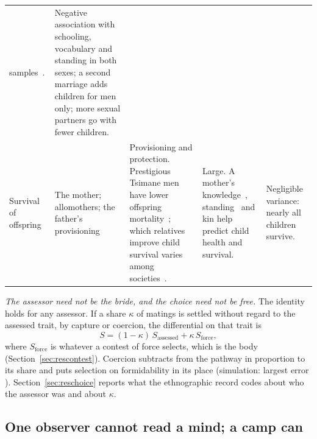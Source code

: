 \begin{table}[t]
\begin{tabularx}{\textwidth}{@{}P{0.115\textwidth}P{0.125\textwidth}LLP{0.205\textwidth}@{}}
samples~\cite{jokela2010,moorad2011}. &
Negative association with schooling, vocabulary and standing in both sexes; a second marriage adds children for men
only; more sexual partners go with fewer children.\\
\addlinespace
Survival of off\-spring &
The mother; allomothers; the father's provisioning &
Provisioning and protection. Prestigious Tsimane men have lower offspring mortality~\cite{vonrueden2011}; which relatives
improve child survival varies among societies~\cite{sear2008}. &
Large. A mother's knowledge~\cite{mcdade2007}, standing~\cite{alami2020} and kin help~\cite{sear2008} predict child health and
survival. &
Negligible variance: nearly all children survive.\\
\bottomrule
\end{tabularx}
\end{table}

\emph{The assessor need not be the bride, and the choice need not be free.} The identity holds for any assessor. If a
share $\kappa$ of matings is settled without regard to the assessed trait, by capture or coercion, the differential on
that trait is
\begin{equation}
S=(1-\kappa)\,S_{\text{assessed}}+\kappa\,S_{\text{force}},\label{eq:coercion}
\end{equation}
where $S_{\text{force}}$ is whatever a contest of force selects, which is the body (Section~\ref{sec:rescontest}).
Coercion subtracts from the pathway in proportion to its share and puts selection on formidability in its place
(simulation: largest error \NtCoeErr). Section~\ref{sec:reschoice} reports what the ethnographic record codes about who
the assessor was and about $\kappa$.

\subsection{One observer cannot read a mind; a camp can}\label{sec:resjury}

